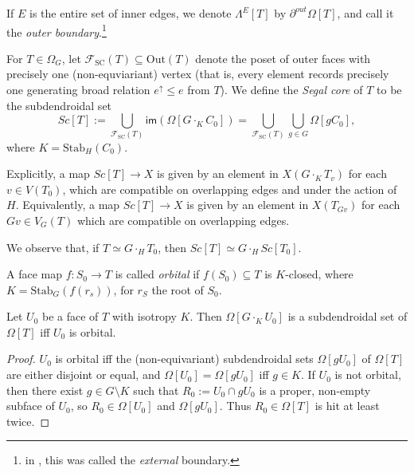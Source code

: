 \documentclass[a4paper,10p,draft]{article}%
\numberwithin{equation}{section}%
\begin{document}
\begin{remark}
      If $E$ is the entire set of inner edges, we denote $\Lambda^{E}[T]$ by $\partial^{out}\Omega[T]$,
      and call it the \textit{outer boundary}.\footnote{
        in \cite{CM13a}, this was called the \textit{external} boundary.}
\end{remark}

\begin{definition}
      For $T \in \Omega_G$, let $\mathscr{F}_{\mathrm{SC}}(T) \subseteq \mathrm{Out}(T)$ denote the poset of outer faces
      with precisely one (non-equviariant) vertex
      (that is, every element records precisely one generating broad relation
      $e^\uparrow \leq e$ from $T$).
      We define the \textit{Segal core} of $T$ to be the subdendroidal set
      \begin{equation}
            Sc[T] := \mathop{\bigcup}\limits_{\mathscr{F}_{\mathrm{SC}}(T)}\mathsf{im}\left(\Omega[G \cdot_K C_0]\right)
            = \mathop{\bigcup}\limits_{\mathscr{F}_{\mathrm{SC}}(T)}\mathop{\bigcup}\limits_{g \in G}\Omega[g C_0],
      \end{equation}
      where $K = \mathrm{Stab}_H(C_0)$. 
\end{definition}

\begin{remark}
      Explicitly, a map $Sc[T] \to X$ is given by an element in $X(G \cdot_K T_v)$ for each $v \in V(T_0)$,
      which are compatible on overlapping edges and under the action of $H$.
      Equivalently, a map $Sc[T] \to X$ is given by an element in $X(T_{G v})$ for each $G v \in V_G(T)$
      which are compatible on overlapping edges.
\end{remark}

\begin{remark}
      We observe that, if $T \simeq G \cdot_H T_0$, then
      $Sc[T] \simeq G \cdot_H Sc[T_0]$.
\end{remark}


\begin{definition}
      A face map $f: S_0 \to T$ is called \textit{orbital} if
      $f(S_0) \subseteq T$ is $K$-closed, where $K = \mathrm{Stab}_G(f(r_s))$, for $r_S$ the root of $S_0$.
\end{definition}


\begin{lemma}
      \label{ORB_INJ_LEM}
      Let $U_0$ be a face of $T$ with isotropy $K$.
      Then $\Omega[G \cdot_K U_0]$ is a subdendroidal set of $\Omega[T]$
      iff
      $U_0$ is orbital.
\end{lemma}
\begin{proof}
      $U_0$ is orbital iff the (non-equivariant) subdendroidal sets $\Omega[g U_0]$ of $\Omega[T]$ are either
      disjoint or equal, and $\Omega[U_0] = \Omega[g U_0]$ iff $g \in K$.
      If $U_0$ is not orbital, then there exist $g \in G \setminus K$ such that
      $R_0 := U_0 \cap g U_0$ is a proper, non-empty subface of $U_0$, so $R_0 \in \Omega[U_0]$ and $\Omega[g U_0]$.
      Thus $R_0 \in \Omega[T]$ is hit at least twice.
\end{proof}
\end{document}

